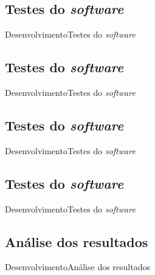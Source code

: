 \subsection{Testes do \textit{software}}
\begin{frame}{Desenvolvimento}{Testes do \textit{software}}

\end{frame}

\subsection{Testes do \textit{software}}
\begin{frame}{Desenvolvimento}{Testes do \textit{software}}

\end{frame}

\subsection{Testes do \textit{software}}
\begin{frame}{Desenvolvimento}{Testes do \textit{software}}

\end{frame}

\subsection{Testes do \textit{software}}
\begin{frame}{Desenvolvimento}{Testes do \textit{software}}

\end{frame}

\subsection{Análise dos resultados}
\begin{frame}{Desenvolvimento}{Análise dos resultados}

\end{frame}
